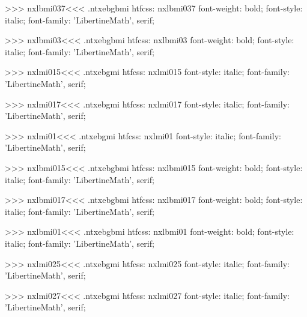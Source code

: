 >>>
\<nxlbmi037\><<<
.ntxebgbmi
htfcss:  nxlbmi037  font-weight: bold; font-style: italic; font-family: 'LibertineMath', serif;

>>>
\<nxlbmi03\><<<
.ntxebgbmi
htfcss:  nxlbmi03  font-weight: bold; font-style: italic; font-family: 'LibertineMath', serif;

>>>
\<nxlmi015\><<<
.ntxebgmi
htfcss:  nxlmi015  font-style: italic; font-family: 'LibertineMath', serif;

>>>
\<nxlmi017\><<<
.ntxebgmi
htfcss:  nxlmi017  font-style: italic; font-family: 'LibertineMath', serif;

>>>
\<nxlmi01\><<<
.ntxebgmi
htfcss:  nxlmi01  font-style: italic; font-family: 'LibertineMath', serif;

>>>
\<nxlbmi015\><<<
.ntxebgbmi
htfcss:  nxlbmi015  font-weight: bold; font-style: italic; font-family: 'LibertineMath', serif;

>>>
\<nxlbmi017\><<<
.ntxebgbmi
htfcss:  nxlbmi017  font-weight: bold; font-style: italic; font-family: 'LibertineMath', serif;

>>>
\<nxlbmi01\><<<
.ntxebgbmi
htfcss:  nxlbmi01  font-weight: bold; font-style: italic; font-family: 'LibertineMath', serif;

>>>
\<nxlmi025\><<<
.ntxebgmi
htfcss:  nxlmi025  font-style: italic; font-family: 'LibertineMath', serif;

>>>
\<nxlmi027\><<<
.ntxebgmi
htfcss:  nxlmi027  font-style: italic; font-family: 'LibertineMath', serif;


